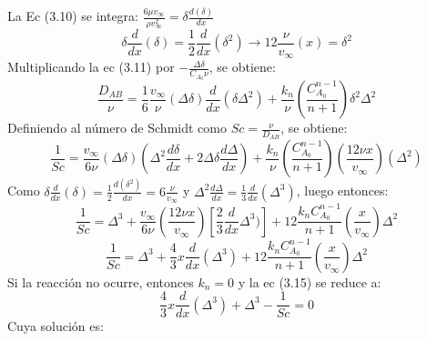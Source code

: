 \documentclass{article}
\begin{document}
La Ec (3.10) se integra: $\frac{6\mu v_\infty}{\rho v_\infty ^2}=\delta\frac{d(\delta)}{dx}$
\begin{equation}
    \delta \frac{d}{dx}(\delta)=\frac{1}{2}\frac{d}{dx}(\delta^2) \rightarrow12\frac{\nu}{v_\infty}(x)=\delta^2
\end{equation}
Multiplicando la ec (3.11) por $-\frac{\Delta \delta}{C_{A_0}\nu}$, se obtiene:
\begin{equation*}
    \frac{D_{AB}}{\nu}=\frac{1}{6}\frac{v_\infty}{\nu}(\Delta \delta)\frac{d}{dx}(\delta \Delta^2)+\frac{k_n}{\nu}(\frac{C_{A_0}^{n-1}}{n+1})\delta^2 \Delta^2
\end{equation*}
Definiendo al número de Schmidt como $Sc=\frac{\nu}{D_{AB}}$, se obtiene:
\begin{equation*}
    \frac{1}{Sc}=\frac{v_\infty}{6\nu}(\Delta \delta)(\Delta^2\frac{d\delta}{dx}+2\Delta \delta \frac{d\Delta}{dx})+\frac{k_n}{\nu}(\frac{C_{A_0}^{n-1}}{n+1})(\frac{12\nu x}{v_\infty})(\Delta^2)
\end{equation*}
Como $\delta \frac{d}{dx}(\delta)=\frac{1}{2}\frac{d(\delta^2)}{dx}=6\frac{\nu}{v_\infty}$ y $\Delta^2\frac{d\Delta}{dx}=\frac{1}{3}\frac{d}{dx}(\Delta^3)$, luego entonces:
\begin{equation*}
    \frac{1}{Sc}=\Delta^3+\frac{v_\infty}{6 \nu}(\frac{12\nu x}{v_\infty})[\frac{2}{3}\frac{d}{dx}\Delta^3)]+12\frac{k_nC_{A_0}^{n-1}}{n+1}(\frac{x}{v_\infty})\Delta^2
\end{equation*}
\begin{equation}
    \frac{1}{Sc}=\Delta^3+\frac{4}{3}x\frac{d}{dx}(\Delta^3)+12\frac{k_nC_{A_0}^{n-1}}{n+1}(\frac{x}{v_\infty})\Delta^2
\end{equation}
Si la reacción no ocurre, entonces $k_n=0$ y la ec (3.15) se reduce a:
\begin{equation}
    \frac{4}{3}x\frac{d}{dx}(\Delta^3)+\Delta^3-\frac{1}{Sc}=0
\end{equation}
Cuya solución es:
\end{document}
